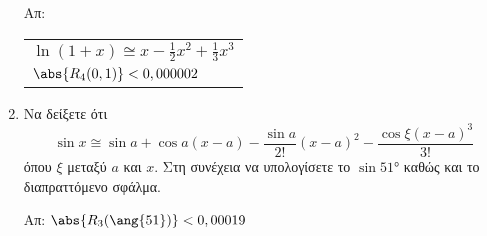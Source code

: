 \begin{enumerate}
      \hfill Απ: \begin{tabular}{l}
        $ \ln(1+x) \cong x - \frac{1}{2} x^{2} + \frac{1}{3}x^{3} $ \\
        $ \abs{R_{4}(0,1)} < 0,000002$	
      \end{tabular}

    \item Να δείξετε ότι 
      \[
        \sin{x} \cong \sin{a} + \cos{a} (x-a) - \frac{\sin{a}}{2!} (x-a)^{2} -
        \frac{\cos{\xi} (x-a)^{3}}{3!}
      \]
      όπου $\xi$ μεταξύ $a$ και $x$. Στη συνέχεια να υπολογίσετε το $
      \sin{\ang{51}}$ καθώς και το διαπραττόμενο σφάλμα.

      \hfill Απ: $ \abs{R_{3}(\ang{51})} < 0,00019 $
  \end{enumerate}


  
